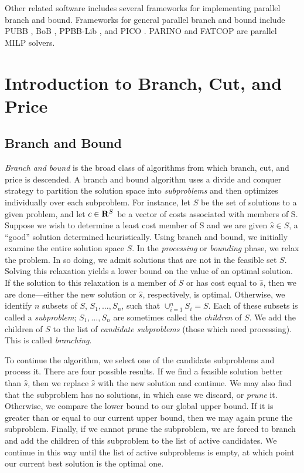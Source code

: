 Other related software includes several frameworks for implementing
parallel branch and bound. Frameworks for general parallel branch and
bound include PUBB \cite{PUBB}, BoB \cite{BoB}, PPBB-Lib
\cite{PPBB-Lib}, and PICO \cite{PICO}. PARINO \cite{PARINO} and FATCOP
\cite{FATCOP} are parallel MILP solvers.

\section{Introduction to Branch, Cut, and Price}
\label{B&C-intro}

\subsection{Branch and Bound}

{\em Branch and bound} is the broad class of algorithms from which
branch, cut, and price is descended. A branch and bound algorithm uses
a divide and conquer strategy to partition the solution space into
{\em subproblems} and then optimizes individually over each
subproblem. For instance, let $S$ be the set of solutions to a given
problem, and let $c \in {\bf R}^S$ be a vector of costs associated
with members of S. Suppose we wish to determine a least cost member of
S and we are given $\hat{s} \in S$, a ``good'' solution determined
heuristically. Using branch and bound, we initially examine the entire
solution space $S$. In the {\em processing} or {\em bounding} phase,
we relax the problem. In so doing, we admit solutions that are not in
the feasible set $S$. Solving this relaxation yields a lower bound on
the value of an optimal solution. If the solution to this relaxation
is a member of $S$ or has cost equal to $\hat{s}$, then we are
done---either the new solution or $\hat{s}$, respectively, is optimal.
Otherwise, we identify $n$ subsets of $S$, $S_1, \ldots, S_n$, such
that $\cup_{i = 1}^n S_i = S$. Each of these subsets is called a {\em
subproblem}; $S_1, \ldots, S_n$ are sometimes called the {\em
children} of $S$. We add the children of $S$ to the list of {\em
candidate subproblems} (those which need processing). This is called
{\em branching}.

To continue the algorithm, we select one of the candidate subproblems
and process it. There are four possible results. If we find a feasible
solution better than $\hat{s}$, then we replace $\hat{s}$ with the new
solution and continue. We may also find that the subproblem has no
solutions, in which case we discard, or {\em prune} it. Otherwise, we
compare the lower bound to our global upper bound. If it is greater
than or equal to our current upper bound, then we may again prune the
subproblem. Finally, if we cannot prune the subproblem, we are forced
to branch and add the children of this subproblem to the list of
active candidates. We continue in this way until the list of active
subproblems is empty, at which point our current best solution is the
optimal one.

